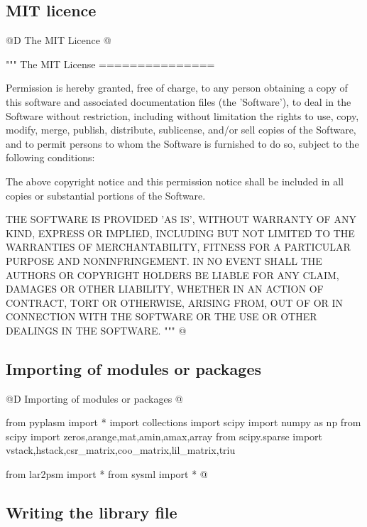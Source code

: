 \documentclass[11pt,oneside]{article}	%
\begin{document}
\subsection{MIT licence}
@D The MIT Licence
@{
"""
The MIT License
===============
	
Permission is hereby granted, free of charge, to any person obtaining
a copy of this software and associated documentation files (the
'Software'), to deal in the Software without restriction, including
without limitation the rights to use, copy, modify, merge, publish,
distribute, sublicense, and/or sell copies of the Software, and to
permit persons to whom the Software is furnished to do so, subject to
the following conditions:

The above copyright notice and this permission notice shall be
included in all copies or substantial portions of the Software.

THE SOFTWARE IS PROVIDED 'AS IS', WITHOUT WARRANTY OF ANY KIND,
EXPRESS OR IMPLIED, INCLUDING BUT NOT LIMITED TO THE WARRANTIES OF
MERCHANTABILITY, FITNESS FOR A PARTICULAR PURPOSE AND NONINFRINGEMENT.
IN NO EVENT SHALL THE AUTHORS OR COPYRIGHT HOLDERS BE LIABLE FOR ANY
CLAIM, DAMAGES OR OTHER LIABILITY, WHETHER IN AN ACTION OF CONTRACT,
TORT OR OTHERWISE, ARISING FROM, OUT OF OR IN CONNECTION WITH THE
SOFTWARE OR THE USE OR OTHER DEALINGS IN THE SOFTWARE.
"""
@}
\subsection{Importing of modules or packages}
@D Importing of modules or packages
@{from pyplasm import *
import collections
import scipy
import numpy as np
from scipy import zeros,arange,mat,amin,amax,array
from scipy.sparse import vstack,hstack,csr_matrix,coo_matrix,lil_matrix,triu

from lar2psm import *
from sysml import *
@}

\subsection{Writing the library file}
\end{document}
